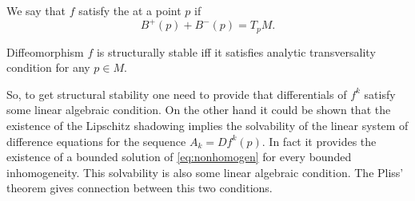 \begin{deffnon}
We say that $f$ satisfy the  at a point $p$ if
\begin{equation*}
B^+(p)+B^-(p)=T_pM.
\end{equation*}
\end{deffnon}

\begin{theoremnon} Diffeomorphism $f$ is structurally stable iff it satisfies analytic transversality condition for any $p\in M$.
\end{theoremnon}

So, to get structural stability one need to provide that differentials of $f^k$ satisfy some linear algebraic condition. On the other hand it could be shown that the existence of the Lipschitz shadowing implies the solvability of the linear system of difference equations for the sequence $A_k=Df^k(p).$ In fact it provides the existence of a bounded solution of \eqref{eq:nonhomogen} for every bounded inhomogeneity.  This solvability is also some linear algebraic condition. The Pliss' theorem gives connection between this two conditions.
